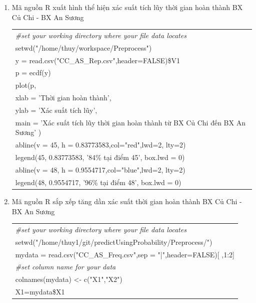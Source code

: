 \documentclass[a4paper, 13pt]{report}
\begin{document}
\begin{enumerate}[label=\textbf{PL\arabic*}]
\begin{flushleft}
\begin{tabular}{ |l| }
\hline
\end{tabular}
\end{flushleft}
\item \label{xacsuatTLTGHT} Mã nguồn R xuất hình thể hiện xác suất tích lũy thời gian hoàn thành BX Củ Chi - BX An Sương\\
\begin{flushleft}
\begin{tabular}{ |l| }
\hline
\textit{\#set your working directory where your file data locates}\\
setwd("/home/thuy/workspace/Preprocess")\\
y = read.csv("CC\_AS\_Rep.csv",header=FALSE)\$V1\\
p = ecdf(y)\\
plot(p,\\
\hspace{1cm} xlab = 'Thời gian hoàn thành', \\
\hspace{1cm} ylab = 'Xác suất tích lũy', \\
\hspace{1cm} main = 'Xác suất tích lũy thời gian hoàn thành từ BX Củ Chi đến BX An Sương'
)\\
abline(v = 45, h = 0.83773583,col="red",lwd=2, lty=2)\\
legend(45, 0.83773583, '84\% tại điểm 45', box.lwd = 0)\\
abline(v = 48, h = 0.9554717,col="blue",lwd=2, lty=2)\\
legend(48, 0.9554717, '96\% tại điểm 48', box.lwd = 0)\\ 
\hline
\end{tabular}
\end{flushleft}
\item \label{sapxepTGHT} Mã nguồn R sắp xếp tăng dần xác suất thời gian hoàn thành BX Củ Chi - BX An Sương\\
\begin{flushleft}
\begin{tabular}{ |l| }
\hline
\textit{\#set your working directory where your file data locates}\\
setwd("/home/thuy1/git/predictUsingProbability/Preprocess/")\\
mydata = read.csv("CC\_AS\_Freq.csv",sep = "|",header=FALSE)[ ,1:2]\\
\textit{\#set column name for your data}\\
colnames(mydata) <- c("X1","X2")\\
X1=mydata\$X1\\

\end{tabular}
\end{flushleft}
\end{enumerate}
\end{document}
